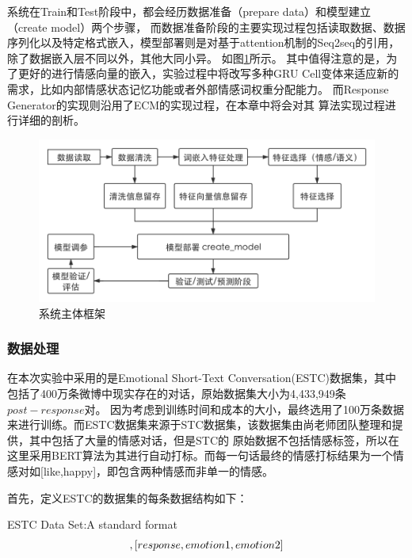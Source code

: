 \documentclass[supercite]{HustGraduPaper}
\theoremstyle{definition}
\begin{document}
系统在Train和Test阶段中，都会经历数据准备（prepare data）和模型建立（create model）两个步骤，
而数据准备阶段的主要实现过程包括读取数据、数据序列化以及特定格式嵌入，模型部署则是对基于attention机制的Seq2seq的引用，除了数据嵌入层不同以外，其他大同小异。
如图\ref{Fig.main}所示。
其中值得注意的是，为了更好的进行情感向量的嵌入，实验过程中将改写多种GRU Cell变体来适应新的需求，比如内部情感状态记忆功能或者外部情感词权重分配能力。
而Response Generator的实现则沿用了ECM的实现过程，在本章中将会对其
算法实现过程进行详细的剖析。
\begin{figure}[H] %
  \centering %
  \includegraphics[width=1\textwidth]{images/main.png} %
  \caption{系统主体框架} %
  \label{Fig.main} %
\end{figure}

\subsubsection{数据处理}
在本次实验中采用的是Emotional Short-Text Conversation(ESTC)数据集，其中包括了400万条微博中现实存在的对话，原始数据集大小为4,433,949条$post-response$对。
因为考虑到训练时间和成本的大小，最终选用了100万条数据来进行训练。而ESTC数据集来源于STC数据集，该数据集由尚老师团队整理和提供，其中包括了大量的情感对话，但是STC的
原始数据不包括情感标签，所以在这里采用BERT算法为其进行自动打标。而每一句话最终的情感打标结果为一个情感对如[like,happy]，即包含两种情感而非单一的情感。

首先，定义ESTC的数据集的每条数据结构如下：
\begin{shaded*}
    {ESTC Data Set:A standard format}
    \begin{align}
    [post, emotion 1, emotion 2],[response, emotion 1, emotion 2]\notag
    \end{align}
\end{shaded*}
\end{document}

